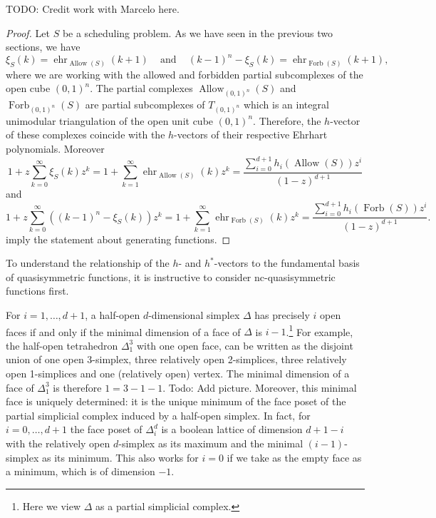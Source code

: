 \documentclass[12pt,reqno]{amsart}
\numberwithin{definition}{section}
\theoremstyle{definition}
\newcommand{\ehr}{\operatorname{ehr}}
\newcommand{\T}{T} %
\newcommand{\TC}{\T_{(0,1)^n}} %
\newcommand{\allow}{\operatorname{Allow}} %
\newcommand{\forb}{\operatorname{Forb}} %
\newcommand{\allowC}{\allow_{(0,1)^n}} %
\newcommand{\forbC}{\forb_{(0,1)^n}} %
\newcommand{\comment}[1]{\textsf{\footnotesize #1}}
\begin{document}
\comment{TODO: Credit work with Marcelo here.}

\begin{proof}
Let $S$ be a scheduling problem. As we have seen in the previous two sections, we have
\[
  \xi_S(k) = \ehr_{\allow(S)}(k+1) \;\;\; \text{ and } \;\;\; (k-1)^n - \xi_{S}(k) = \ehr_{\forb(S)}(k+1),
\]
where we are working with the allowed and forbidden partial subcomplexes of the open cube $(0,1)^n$. The partial complexes $\allowC(S)$ and $\forbC(S)$ are partial subcomplexes of $\TC$ which is an integral unimodular triangulation of the open unit cube $(0,1)^n$. Therefore, the $h$-vector of these complexes coincide with the $h$-vectors of their respective Ehrhart polynomials. Moreover
\[
 1 + z\sum_{k = 0}^\infty \xi_S(k) z^k =  1 + \sum_{k = 1}^\infty \ehr_{\allow(S)}(k) z^k = \frac{\sum_{i=0}^{d+1} h_i(\allow(S)) z^i}{(1-z)^{d+1}}
\]
and
\[
 1 + z\sum_{k = 0}^\infty \left( (k-1)^n - \xi_S(k) \right) z^k =  1 + \sum_{k = 1}^\infty \ehr_{\forb(S)}(k) z^k = \frac{\sum_{i=0}^{d+1} h_i(\forb(S)) z^i}{(1-z)^{d+1}}.
\]
imply the statement about generating functions.
\end{proof}

To understand the relationship of the $h$- and $h^*$-vectors to the fundamental basis of quasisymmetric functions, it is instructive to consider nc-quasisymmetric functions first.

For $i=1,\ldots,d+1$, a half-open $d$-dimensional simplex $\Delta$ has precisely $i$ open faces if and only if the minimal dimension of a face of $\Delta$ is $i-1$.\footnote{Here we view $\Delta$ as a partial simplicial complex.} For example, the half-open tetrahedron $\Delta^3_1$ with one open face, can be written as the disjoint union of one open 3-simplex, three relatively open 2-simplices, three relatively open 1-simplices and one (relatively open) vertex. The minimal dimension of a face of $\Delta^3_1$ is therefore $1=3-1-1$. \comment{Todo: Add picture.} Moreover, this minimal face is uniquely determined: it is the unique minimum of the face poset of the partial simplicial complex induced by a half-open simplex. In fact, for $i=0,\ldots,d+1$ the face poset of $\Delta^d_i$ is a boolean lattice of dimension $d+1-i$ with the relatively open $d$-simplex as its maximum and the minimal $(i-1)$-simplex as its minimum. This also works for $i=0$ if we take as the empty face as a minimum, which is of dimension $-1$.
\end{document}
